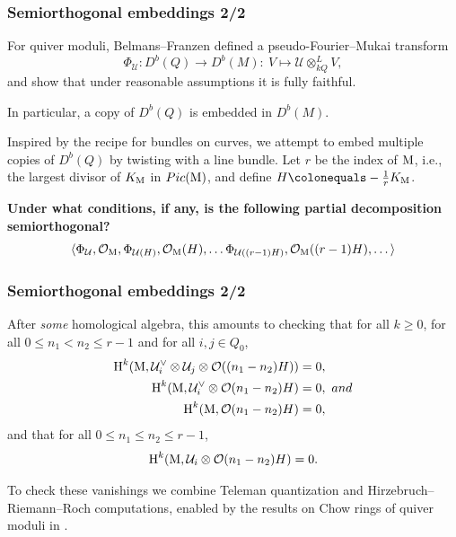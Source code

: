 \documentclass{beamer}
\begin{document}
\begin{frame}
    \frametitle{Semiorthogonal embeddings 2/2}
For quiver moduli, Belmans--Franzen \cite{vector-fields-paper}
defined a pseudo-Fourier--Mukai transform
\[\Phi_{\mathcal{U}} : D^b(Q) \to D^b(M) :~V \mapsto \mathcal{U} \otimes_{k Q}^{L} V, \]
and show that under reasonable assumptions it is fully faithful.

In particular, a copy of $D^b(Q)$ is embedded in $D^b(M)$. \pause

Inspired by the recipe for bundles on curves, we attempt to embed
multiple copies of $D^b(Q)$ by twisting with a line bundle. \pause
\vfill
Let $r$ be the index of $\operatorname{M}$, i.e.,
the largest divisor of $K_{\operatorname{M}}$ in $Pic(\operatorname{M})$, and
define $H \colonequals -\frac{1}{r}K_{\modulispace}$. \pause

\textbf{Under what conditions, if any, is the following partial decomposition semiorthogonal?}
\[
    \langle
    \Phi_{\mathcal{U}}, \mathcal{O}_{\operatorname{M}},
    \Phi_{\mathcal{U}(H)}, \mathcal{O}_{\operatorname{M}}(H), \dots
    \Phi_{\mathcal{U}((r-1)H)}, \mathcal{O}_{\operatorname{M}}((r-1)H), \dots
    \rangle
\]
\end{frame}

\begin{frame}
    \frametitle{Semiorthogonal embeddings 2/2}

After \emph{some} homological algebra, this amounts to checking that for all $k \geq 0$,
for all $0 \leq n_1 < n_2 \leq r-1$ and for all $i,j \in Q_0$,
\begin{align}
    \operatorname{H}^k(\operatorname{M}, \mathcal{U}^\vee_i \otimes \mathcal{U}_j \otimes \mathcal{O}((n_1 - n_2)H)) &= 0, \label{equation:needed-UidualUjH}\\
    \operatorname{H}^k(\operatorname{M}, \mathcal{U}^\vee_i \otimes \mathcal{O}(n_1 - n_2)H) &= 0,\ and \label{equation:needed-UidualH}\\
    \operatorname{H}^k(\operatorname{M}, \mathcal{O}(n_1 - n_2)H) &= 0, \label{equation:needed-H}
\end{align}
and that for all $0 \leq n_1 \leq n_2 \leq r-1$,
\begin{equation}
    \operatorname{H}^k(\operatorname{M}, \mathcal{U}_i \otimes \mathcal{O}(n_1 - n_2)H) = 0. \label{equation:needed-UiH}
\end{equation} \pause

To check these vanishings we combine Teleman quantization
and Hirzebruch--Riemann--Roch computations, enabled by the results
on Chow rings of quiver moduli in \cite{MR3318266,chow-paper}.
\end{frame}
\end{document}
